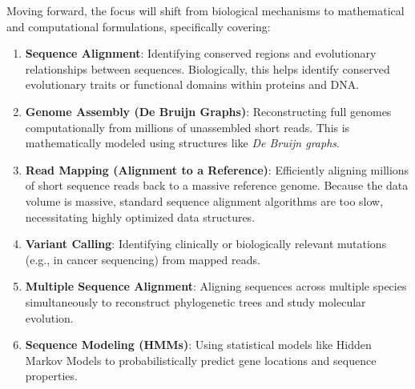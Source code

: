Moving forward, the focus will shift from biological mechanisms to mathematical and computational formulations, specifically covering:
\begin{enumerate}
  \item \textbf{Sequence Alignment}: Identifying conserved regions and evolutionary relationships between sequences. Biologically, this helps identify conserved evolutionary traits or functional domains within proteins and DNA.
  \item \textbf{Genome Assembly (De Bruijn Graphs)}: Reconstructing full genomes computationally from millions of unassembled short reads. This is mathematically modeled using structures like \textit{De Bruijn graphs}.
  \item \textbf{Read Mapping (Alignment to a Reference)}: Efficiently aligning millions of short sequence reads back to a massive reference genome. Because the data volume is massive, standard sequence alignment algorithms are too slow, necessitating highly optimized data structures.
  \item \textbf{Variant Calling}: Identifying clinically or biologically relevant mutations (e.g., in cancer sequencing) from mapped reads.
  \item \textbf{Multiple Sequence Alignment}: Aligning sequences across multiple species simultaneously to reconstruct phylogenetic trees and study molecular evolution.
  \item \textbf{Sequence Modeling (HMMs)}: Using statistical models like Hidden Markov Models to probabilistically predict gene locations and sequence properties.
\end{enumerate}
